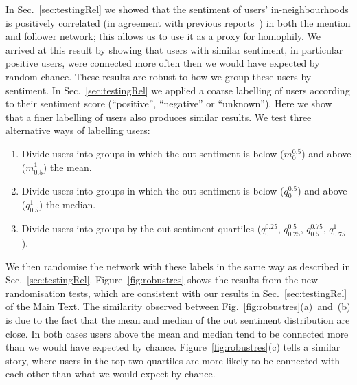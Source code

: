 \documentclass{article}
\begin{document}
In Sec.~\ref{sec:testingRel} we showed that the sentiment of users'
in-neighbourhoods is positively correlated (in agreement with previous
reports~\cite{Bliss2012}) in both the mention and follower network;
this allows us to use it as a proxy for homophily.  We arrived at this
result by showing that users with similar sentiment, in particular
positive users, were connected more often then we would have expected
by random chance. These results are robust to how we group these users
by sentiment. In Sec.~\ref{sec:testingRel} we applied a coarse
labelling of users according to their sentiment score (``positive'',
``negative'' or ``unknown''). Here we show that a finer labelling of
users also produces similar results. We test three alternative ways of
labelling users:
\begin{enumerate}
  \item Divide users into groups in which the out-sentiment is below
    ($m_0^{0.5}$) and above ($m_{0.5}^1$) the mean.
  \item Divide users into groups in which the out-sentiment is below ($q_{0}^{0.5}$) and
    above ($q_{0.5}^{1}$) the median. 
  \item Divide users into groups by the out-sentiment quartiles ($q_{0}^{0.25}$, $q_{0.25}^{0.5}$,
    $q_{0.5}^{0.75}$, $q_{0.75}^{1}$).
\end{enumerate}
We then randomise the network with these labels in the same way as
described in Sec.~\ref{sec:testingRel}.  Figure~\ref{fig:robustres}
shows the results from the new randomisation tests, which are
consistent with our results in Sec.~\ref{sec:testingRel} of the Main
Text.  The similarity observed between
Fig.~\ref{fig:robustres}(a)~and~(b) is due to the fact that the mean
and median of the out sentiment distribution are close. In both cases
users above the mean and median tend to be connected more than we
would have expected by chance. Figure~\ref{fig:robustres}(c) tells a
similar story, where users in the top two quartiles are more likely to
be connected with each other than what we would expect by chance.



%
\end{document}
